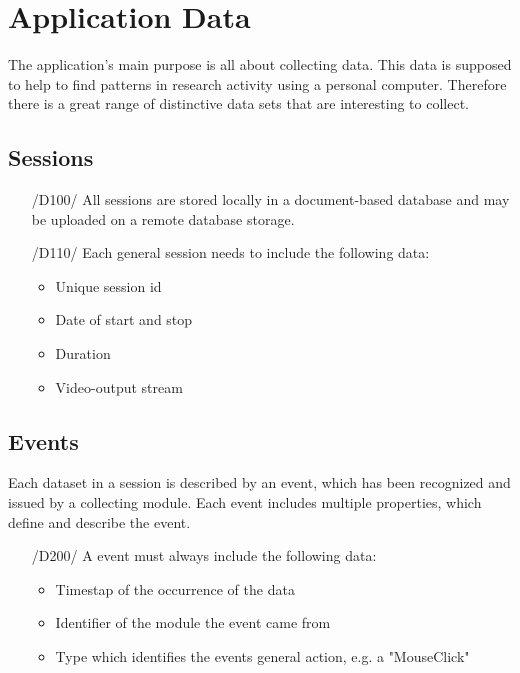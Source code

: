 \chapter{Application Data}
\label{ch:data}

The application's main purpose is all about collecting data. This data is supposed to help to find patterns in research activity using a personal computer. Therefore there is a great range of distinctive data sets that are interesting to collect.

\section{Sessions}
\begin{itemize}

\item[/D100/] All sessions are stored locally in a document-based database and may be uploaded on a remote database storage.

\item[/D110/] Each general session needs to include the following data:
	\begin{itemize}
	\item Unique session id
	\item Date of start and stop
	\item Duration
	\item Video-output stream
	\end{itemize}
\end{itemize}

\section{Events}

Each dataset in a session is described by an event, which has been recognized and issued by a collecting module. Each event includes multiple properties, which define and describe the event.

\begin{itemize}
\item[/D200/] A event must always include the following data:
	\begin{itemize}
	\item Timestap of the occurrence of the data
	\item Identifier of the module the event came from
	\item Type which identifies the events general action, e.g. a "MouseClick"
	\end{itemize}
\end{itemize}


